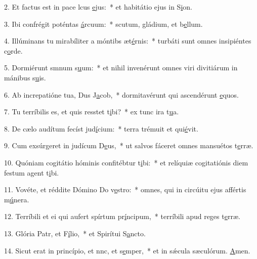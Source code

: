 2. Et factus est in pace lcus \uline{e}jus:~* et habitátio ejus in S\uline{i}on.\par 
3. Ibi confrégit poténtas \uline{á}rcuum:~* scutum, gládium, et b\uline{e}llum.\par 
4. Illúminans tu mirabíliter a móntibs æt\uline{é}rnis:~* turbáti sunt omnes insipiéntes c\uline{o}rde.\par 
5. Dormiérunt smnum s\uline{u}um:~* et nihil invenérunt omnes viri divitiárum in mánibus s\uline{u}is.\par 
6. Ab increpatióne tua, Dus J\uline{a}cob,~* dormitavérunt qui ascendérunt \uline{e}quos.\par 
7. Tu terríbilis es, et quis resstet t\uline{i}bi?~* ex tunc ira t\uline{u}a.\par 
8. De cælo audítum fecíst jud\uline{í}cium:~* terra trémuit et qui\uline{é}vit.\par 
9. Cum exsúrgeret in judícum D\uline{e}us,~* ut salvos fáceret omnes mansuétos t\uline{e}rræ.\par 
10. Quóniam cogitátio hóminis confitébtur t\uline{i}bi:~* et relíquiæ cogitatiónis diem festum agent t\uline{i}bi.\par 
11. Vovéte, et réddite Dómino Do v\uline{e}stro:~* omnes, qui in circúitu ejus affértis m\uline{ú}nera.\par 
12. Terríbili et ei qui aufert spírtum pr\uline{í}ncipum,~* terríbili apud reges t\uline{e}rræ.\par 
13. Glória Patr, et F\uline{í}lio,~* et Spirítui S\uline{a}ncto.\par 
14. Sicut erat in princípio, et nnc, et s\uline{e}mper,~* et in sǽcula sæculórum. \uline{A}men.\par 
